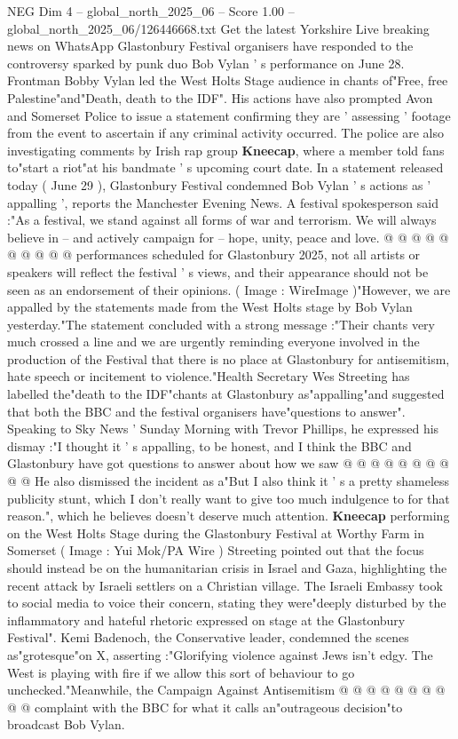 \begin{textsample}{NEG Dim 4 – global\_north\_2025\_06 – Score 1.00 – global\_north\_2025\_06/126446668.txt}  \label{ex:f4_neg_073}
Get the latest Yorkshire Live breaking news on WhatsApp Glastonbury Festival organisers have responded to the controversy sparked by punk duo Bob Vylan ' s performance on June 28.
Frontman Bobby Vylan led the West Holts Stage audience in chants of"Free, free Palestine"and"Death, death to the IDF".
His actions have also prompted Avon and Somerset Police to issue a statement confirming they are ' assessing ' footage from the event to ascertain if any criminal activity occurred.
The police are also investigating comments by Irish rap group \textbf{Kneecap}, where a member told fans to"start a riot"at his bandmate ' s upcoming court date.
In a statement released today ( June 29 ), Glastonbury Festival condemned Bob Vylan ' s actions as ' appalling ', reports the Manchester Evening News.
A festival spokesperson said :"As a festival, we stand against all forms of war and terrorism.
We will always believe in -- and actively campaign for -- hope, unity, peace and love. @ @ @ @ @ @ @ @ @ @ performances scheduled for Glastonbury 2025, not all artists or speakers will reflect the festival ' s views, and their appearance should not be seen as an endorsement of their opinions. ( Image : WireImage )"However, we are appalled by the statements made from the West Holts stage by Bob Vylan yesterday."The statement concluded with a strong message :"Their chants very much crossed a line and we are urgently reminding everyone involved in the production of the Festival that there is no place at Glastonbury for antisemitism, hate speech or incitement to violence."Health Secretary Wes Streeting has labelled the"death to the IDF"chants at Glastonbury as"appalling"and suggested that both the BBC and the festival organisers have"questions to answer".
Speaking to Sky News ' Sunday Morning with Trevor Phillips, he expressed his dismay :"I thought it ' s appalling, to be honest, and I think the BBC and Glastonbury have got questions to answer about how we saw @ @ @ @ @ @ @ @ @ @ He also dismissed the incident as a"But I also think it ' s a pretty shameless publicity stunt, which I don't really want to give too much indulgence to for that reason.", which he believes doesn't deserve much attention. \textbf{Kneecap} performing on the West Holts Stage during the Glastonbury Festival at Worthy Farm in Somerset ( Image : Yui Mok/PA Wire ) Streeting pointed out that the focus should instead be on the humanitarian crisis in Israel and Gaza, highlighting the recent attack by Israeli settlers on a Christian village.
The Israeli Embassy took to social media to voice their concern, stating they were"deeply disturbed by the inflammatory and hateful rhetoric expressed on stage at the Glastonbury Festival".
Kemi Badenoch, the Conservative leader, condemned the scenes as"grotesque"on X, asserting :"Glorifying violence against Jews isn't edgy.
The West is playing with fire if we allow this sort of behaviour to go unchecked."Meanwhile, the Campaign Against Antisemitism @ @ @ @ @ @ @ @ @ @ complaint with the BBC for what it calls an"outrageous decision"to broadcast Bob Vylan.

\end{textsample}
